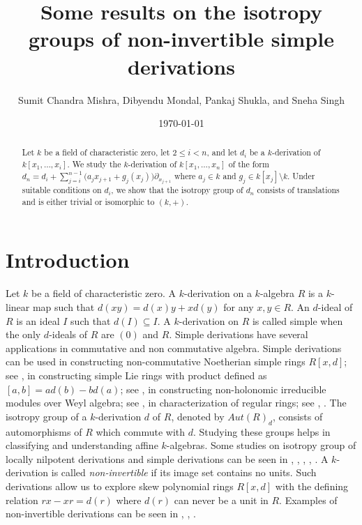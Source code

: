 \documentclass[11pt]{amsart}
\title{Some results on the isotropy groups of non-invertible simple derivations}
\author{Sumit Chandra Mishra, Dibyendu Mondal, Pankaj Shukla, and Sneha Singh}
\date{\today}
\theoremstyle{definition}
\theoremstyle{remark}
\numberwithin{equation}{theorem}
\begin{document}
\begin{abstract}
Let $k$ be a field of characteristic zero, let $2\le i<n$, and let $d_i$ be a $k$-derivation of
$k[x_1,\dots,x_i]$. We study the $k$-derivation of $k[x_1,\dots, x_n]$ of the form
$d_n=d_i+\sum_{j=i}^{n-1}\bigl(a_jx_{j+1}+g_j(x_j)\bigr)\partial_{x_{j+1}}$ where $a_j\in k$ and
$g_j\in k[x_j]\setminus k$. Under suitable conditions on $d_i$, we show that the isotropy group of
$d_n$ consists of translations and is either trivial or isomorphic to $(k,+)$. %
\end{abstract}

\maketitle

\section{Introduction}
Let $k$ be a field of characteristic zero. A $k$-derivation on a $k$-algebra $R$ is a $k$-linear map such that $d(xy)=d(x)y+xd(y)$ for any $x,y\in R$. An $d$-ideal of $R$ is an ideal $I$ such that $d(I)\subseteq I$. A $k$-derivation on $R$ is called simple when the only $d$-ideals of $R$ are $(0)$ and $R$. Simple derivations have several applications in commutative and non commutative algebra. Simple derivations can be used in constructing  non-commutative Noetherian simple rings $R[x,d]$; see \cite{Ore33}, in constructing simple Lie rings with product defined as $[a,b]=ad(b)-bd(a)$; see \cite{JJ78}, in constructing non-holonomic irreducible modules over Weyl algebra; see \cite{Cou07}, in characterization of regular rings; see \cite{Sei67}, \cite{Har75}. The isotropy group of a $k$-derivation $d$ of $R$, denoted by $Aut(R)_d$, consists of automorphisms of $R$ which commute with $d$. Studying these groups helps in classifying and understanding affine $k$-algebras. Some studies on isotropy group of locally nilpotent derivations and simple derivations can be seen in \cite{Yan22}, \cite{Yan24}, \cite{MP17}, \cite{BV21}, \cite{BL20}.  A $k$-derivation is called {\it non-invertible} if its image set contains no units. Such derivations allow us to explore skew polynomial rings $R[x,d]$ with the defining relation $rx-xr=d(r)$ where $d(r)$ can never be a unit in $R$. Examples of non-invertible derivations can be seen in \cite{Jor81}, \cite{PS26}, \cite{MMS25'}.
\end{document}
